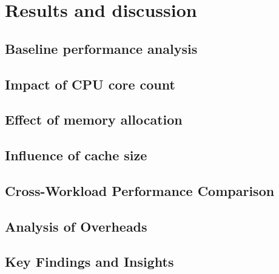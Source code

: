 \chapter{Results and discussion}
\label{chap:results}

\section{Baseline performance analysis}

\section{Impact of CPU core count}

\section{Effect of memory allocation}

\section{Influence of cache size}

\section{Cross-Workload Performance Comparison}

\section{Analysis of Overheads}

\section{Key Findings and Insights}